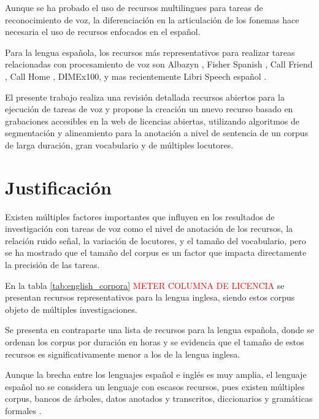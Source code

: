 \documentclass[a4paper,12pt,twoside]{report}
\begin{document}
Aunque se ha probado el uso de recursos multilingues para tareas de reconocimiento de voz, la diferenciación en la articulación de los fonemas hace necesaria el uso de recursos enfocados en el español.

Para la lengua española, los recursos más representativos para realizar tareas relacionadas con procesamiento de voz son Albazyn \cite{CampilloAlbayzinEvaluation}, Fisher Spanish \cite{FischerSpa}, Call Friend \cite{CALLFRIENDSpa}, Call Home \cite{CALLHOMESpa}, DIMEx100\cite{Pineda2004DIMEx100:Spanish}, y mas recientemente Libri Speech español \cite{LibriVox-Spanish}.



El presente trabajo realiza una revisión detallada recursos abiertos para la ejecución de tareas de voz y propone la creación un nuevo recurso basado en grabaciones accesibles en la web de licencias abiertas, utilizando algoritmos de segmentación y alineamiento para la anotación a nivel de sentencia de un corpus de larga duración, gran vocabulario y de múltiples locutores.


\section{Justificación}


Existen múltiples factores importantes que influyen en los resultados de investigación con tareas de voz como el nivel de anotación de los recursos, la relación ruido señal, la variación de locutores, y el tamaño del vocabulario, pero se ha mostrado que el tamaño del corpus es un factor que impacta directamente la precisión de las tareas.

En la tabla \ref{tab:english_corpora} \textcolor{red}{METER COLUMNA DE LICENCIA} se presentan recursos representativos para la lengua inglesa, siendo estos corpus objeto de múltiples investigaciones.



Se presenta en contraparte una lista de recursos para la lengua española, donde se ordenan los corpus por duración en horas y se evidencia que el tamaño de estos recursos es significativamente  menor a los de la lengua inglesa.




Aunque la brecha entre los lenguajes español e inglés es muy amplia, el lenguaje español no se considera un lenguaje con escasos recursos, pues existen múltiples corpus, bancos de árboles, datos anotados y transcritos, diccionarios y gramáticas formales \cite{CavarGlobalGORILLA}. 
\end{document}
